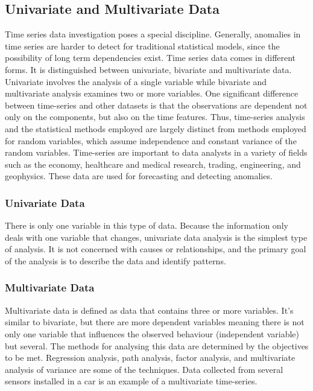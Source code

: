 \subsection{Univariate and Multivariate Data}
Time series data investigation poses a special discipline. Generally, anomalies in time series are harder to detect for traditional statistical models, since the possibility of long term dependencies exist. Time series data comes in different forms. It is distinguished between univariate, bivariate and multivariate data. Univariate involves the analysis of a single variable while bivariate and multivariate analysis examines two or more variables. One significant difference between time-series and other datasets is that the observations are dependent not only on the components, but also on the time features. Thus, time-series analysis and the statistical methods employed are largely distinct from methods employed for random variables, which assume independence and constant variance of the random variables. Time-series are important to data analysts in a variety of fields such as the economy, healthcare and medical research, trading, engineering, and geophysics. These data are used for forecasting and detecting anomalies.

\subsubsection{Univariate Data}
There is only one variable in this type of data. Because the information only deals with one variable that changes, univariate data analysis is the simplest type of analysis. It is not concerned with causes or relationships, and the primary goal of the analysis is to describe the data and identify patterns.


\subsubsection{Multivariate Data}
Multivariate data is defined as data that contains three or more variables. It's similar to bivariate, but there are more dependent variables meaning there is not only one variable that influences the observed behaviour (independent variable) but several. The methods for analysing this data are determined by the objectives to be met. Regression analysis, path analysis, factor analysis, and multivariate analysis of variance are some of the techniques. Data collected from several sensors installed in a car is an example of a multivariate time-series.

